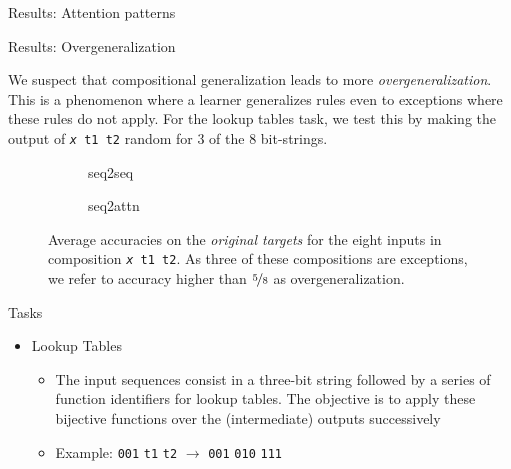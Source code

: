 \documentclass[final,hyperref={pdfpagelabels=false}]{beamer}
\begin{document}
\begin{frame}[t]
\begin{columns}[t]
\begin{column}{.465\textwidth}
\begin{block}{Results: Attention patterns}
\end{block}



\begin{block}{Results: Overgeneralization}
	
We suspect that compositional generalization leads to more  \emph{overgeneralization}. This is a phenomenon where a learner generalizes rules even to exceptions where these rules do not apply. For the lookup tables task, we test this by making the output of \texttt{\textit{x} t1 t2} random for 3 of the 8 bit-strings.
\begin{figure}
	\centering
	\begin{subfigure}{0.5\linewidth}
	
	\caption{seq2seq}
\end{subfigure}%
\begin{subfigure}{0.5\linewidth}
	
	\caption{seq2attn}
\end{subfigure}
\caption{Average accuracies on the \emph{original targets} for the eight inputs in composition \texttt{\textit{x} t1 t2}. As three of these compositions are exceptions, we refer to accuracy higher than $\nicefrac{5}{8}$ as overgeneralization.}
\label{fig:corruption-lookup}
\end{figure}
	
\end{block}


\begin{block}{Tasks}
	
	\begin{itemize}
		\item Lookup Tables
		\begin{itemize}
			\item The input sequences consist in a three-bit string followed by a series of function identifiers for lookup tables. The objective is to apply these bijective functions over the (intermediate) outputs successively
			\item Example: \texttt{001} \texttt{t1} \texttt{t2} $\rightarrow$ \texttt{001} \texttt{010} \texttt{111}
		\end{itemize}
		

\end{itemize}
\end{block}
\end{column}
\end{columns}
\end{frame}
\end{document}
